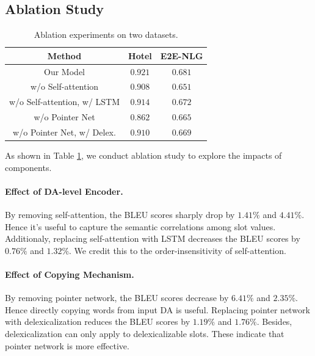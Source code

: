 \documentclass[letterpaper]{article} %
\begin{document}
\subsection{Ablation Study}
	
	\begin{table}[t]
		\centering
		
		\begin{tabular}{c|cc}
			\hline
			
			Method & Hotel & E2E-NLG  \\
			
			\hline
			Our Model & $\mathbf{0.921}$ & $\mathbf{0.681}$ \\ 
			
			\hline
			w/o Self-attention & $0.908$ & $0.651$  \\
			
			w/o Self-attention, w/ LSTM & $0.914$ & $0.672$ \\
			
			\cdashline{1-3}
			w/o Pointer Net & $0.862$ & $0.665$ \\
			w/o Pointer Net, w/ Delex. & $0.910$ & $0.669$ \\
			
			\hline
		\end{tabular}
		\caption{Ablation experiments on two datasets.}
		
		\label{tab:Ablation Study}
	\end{table} 
	
	As shown in Table \ref{tab:Ablation Study}, we conduct ablation study to explore the impacts of components.
	
	\paragraph{Effect of DA-level Encoder.} By removing self-attention, the BLEU scores sharply drop by $1.41\%$ and $4.41\%$. Hence it's useful to capture the semantic correlations among slot values. Additionaly, replacing self-attention with LSTM decreases the BLEU scores by $0.76\%$ and $1.32\%$. We credit this to the order-insensitivity of self-attention.
	
	\paragraph{Effect of Copying Mechanism.} By removing pointer network, the BLEU scores decrease by $6.41\%$ and $2.35\%$. Hence directly copying words from input DA is useful. Replacing pointer network with delexicalization reduces the BLEU scores by $1.19\%$ and $1.76\%$. Besides, delexicalization can only apply to delexicalizable slots. These indicate that pointer network is more effective.
	
\end{document}
